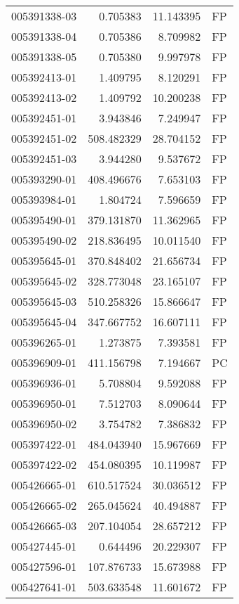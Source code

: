 \begin{tabular}{lrrl}
005391338-03 &    0.705383 &    11.143395 &   FP \\
005391338-04 &    0.705386 &     8.709982 &   FP \\
005391338-05 &    0.705380 &     9.997978 &   FP \\
005392413-01 &    1.409795 &     8.120291 &   FP \\
005392413-02 &    1.409792 &    10.200238 &   FP \\
005392451-01 &    3.943846 &     7.249947 &   FP \\
005392451-02 &  508.482329 &    28.704152 &   FP \\
005392451-03 &    3.944280 &     9.537672 &   FP \\
005393290-01 &  408.496676 &     7.653103 &   FP \\
005393984-01 &    1.804724 &     7.596659 &   FP \\
005395490-01 &  379.131870 &    11.362965 &   FP \\
005395490-02 &  218.836495 &    10.011540 &   FP \\
005395645-01 &  370.848402 &    21.656734 &   FP \\
005395645-02 &  328.773048 &    23.165107 &   FP \\
005395645-03 &  510.258326 &    15.866647 &   FP \\
005395645-04 &  347.667752 &    16.607111 &   FP \\
005396265-01 &    1.273875 &     7.393581 &   FP \\
005396909-01 &  411.156798 &     7.194667 &   PC \\
005396936-01 &    5.708804 &     9.592088 &   FP \\
005396950-01 &    7.512703 &     8.090644 &   FP \\
005396950-02 &    3.754782 &     7.386832 &   FP \\
005397422-01 &  484.043940 &    15.967669 &   FP \\
005397422-02 &  454.080395 &    10.119987 &   FP \\
005426665-01 &  610.517524 &    30.036512 &   FP \\
005426665-02 &  265.045624 &    40.494887 &   FP \\
005426665-03 &  207.104054 &    28.657212 &   FP \\
005427445-01 &    0.644496 &    20.229307 &   FP \\
005427596-01 &  107.876733 &    15.673988 &   FP \\
005427641-01 &  503.633548 &    11.601672 &   FP \\

\end{tabular}
